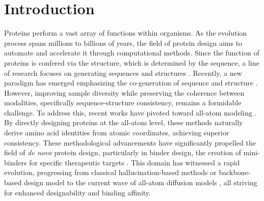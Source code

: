\vspace{-50pt}


\newpage
\section{Introduction}
Proteins perform a vast array of functions within organisms. As the evolution process spans millions to billions of years, the field of protein design aims to automate and accelerate it through computational methods. Since the function of proteins is confered via the structure, which is determined by the sequence, a line of research focuses on generating sequences \citep{dauparasRobustDeepLearning2022, zhengStructureinformedLanguageModels2023, alamdariProteinGenerationEvolutionary2024, wang2024dplm} and structures \cite{yimSE3DiffusionModel2023b, watsonNovoDesignProtein2023, ingrahamIlluminatingProteinSpace2023, zhang2025odesign}. Recently, a new paradigm has emerged emphasizing the co-generation of sequence and structure \cite{wang2025dplm2, hsieh2025dplm2_1, chen2025apm, multiflow}. However, improving sample diversity while preserving the coherence between modalities, specifically sequence-structure consistency, remains a formidable challenge. To address this, recent works have pivoted toward all-atom modeling \cite{quPallatomUnlockingNew2025, geffnerLaProteinaAtomisticProtein2025}. By directly designing proteins at the all-atom level, these methods naturally derive amino acid identities from atomic coordinates, achieving superior consistency. These methodological advancements have significantly propelled the field of \textit{de novo} protein design, particularly in binder design, the creation of mini-binders for specific therapeutic targets \cite{zambaldi2024novo}. This domain has witnessed a rapid evolution, progressing from classical hallucination-based methods \cite{pacesaOneshotDesignFunctional2025} or backbone-based design model \cite{zhang2025odesign, ren2025pxdesign} to the current wave of all-atom diffusion models \cite{butcher2025novo, chai2025zero, team2025latent}, all striving for enhanced designability and binding affinity.



